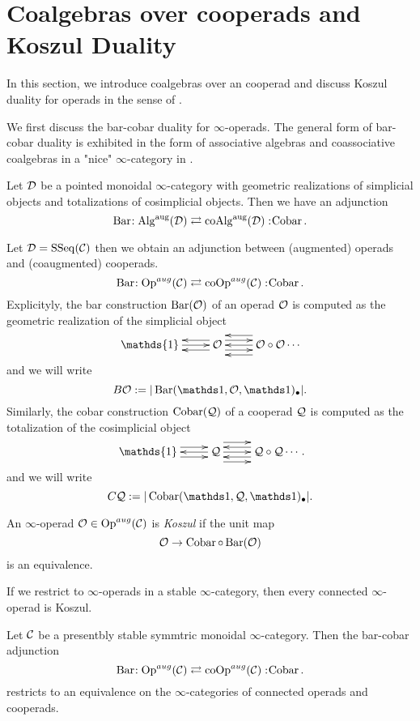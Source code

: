\section{Coalgebras over cooperads and Koszul Duality}
In this section, we introduce coalgebras over an cooperad and discuss Koszul duality for operads in the sense of \cite{Ginzburg-Kapranov}. 

We first discuss the bar-cobar duality for $\infty$-operads. The general form of bar-cobar duality is exhibited in the form of associative algebras and coassociative coalgebras in a "nice" $\infty$-category in \cite{HA}.
\begin{proposition}[\cite{HA}[Remark 5.2.2.19.] 
Let ${\mathcal{D}}$ be a pointed monoidal $\infty$-category with geometric realizations of simplicial objects and totalizations of cosimplicial objects. Then we have an adjunction
\[
\operatorname{Bar}\negmedspace: \operatorname{Alg}^{\operatorname{aug}} ({\mathcal{D}})\rightleftarrows \operatorname{coAlg}^{\operatorname{aug}}({\mathcal{D}}):\negmedspace \operatorname{Cobar}.
\]
\end{proposition}
Let ${\mathcal{D}}= \operatorname{SSeq}({\mathcal{C}})$ then we obtain an adjunction between (augmented) operads and (coaugmented) cooperads.
	$$
	\operatorname{Bar}\negmedspace: \operatorname{Op}^{aug}({\mathcal{C}})\rightleftarrows \operatorname{coOp}^{aug}({\mathcal{C}}):\negmedspace \operatorname{Cobar}.
	$$
Explicityly, the bar construction $\operatorname{Bar}({\mathcal{O}})$ of an operad ${\mathcal{O}}$ is computed as the geometric realization of the simplicial object
	\[
		\xymatrix{ \mathds{1}\ar@<0ex>[r]  &  
		\CO \ar@<1ex>[r] \ar@<-1ex>[r] \ar@<1ex>[l] \ar@<-1ex>[l]  &  \CO\circ \CO \ar@<2ex>[l] \ar@<0ex>[l] \ar@<-2ex>[l] \cdots}
\]
and we will write 
$$
B\CO := |\Barconstruction(\triv, \CO, \triv)_{\bullet}|.
$$
	Similarly, the cobar construction $\operatorname{Cobar}({\mathcal{Q}})$ of a cooperad ${\mathcal{Q}}$ is computed as the totalization of the cosimplicial object
	\[
		\xymatrix{ \mathds{1} \ar@<1ex>[r] \ar@<-1ex>[r] &  
		\CQ \ar@<0ex>[l] \ar@<2ex>[r] \ar@<0ex>[r] \ar@<-2ex>[r] & \CQ\circ \CQ \ar@<1ex>[l] \ar@<-1ex>[l] \cdots}.
\]
and we will write 
$$
C\CQ := |\Cobar(\triv, \CQ, \triv)_{\bullet}|.
$$



\begin{definition}
	An $\infty$-operad ${\mathcal{O}}\in \operatorname{Op}^{aug}({\mathcal{C}})$ is \emph{Koszul} if the unit map
	$$
	{\mathcal{O}}\rightarrow \operatorname{Cobar}\circ \operatorname{Bar}({\mathcal{O}})
	$$
	is an equivalence.
\end{definition}

If we restrict to $\infty$-operads in a stable $\infty$-category, then every connected $\infty$-operad is Koszul.

\begin{proposition}
\cite[Proposition 3.4]{Heuts_Koszul}
\label{Connected operads are Koszul}
Let ${\mathcal{C}}$ be a presentbly stable symmtric monoidal $\infty$-category. Then the bar-cobar adjunction
	$$
	\operatorname{Bar}\negmedspace: \operatorname{Op}^{aug}({\mathcal{C}})\rightleftarrows \operatorname{coOp}^{aug}({\mathcal{C}}):\negmedspace \operatorname{Cobar}.
	$$
	restricts to an equivalence on the  $\infty$-categories of connected operads and cooperads.
\end{proposition}


